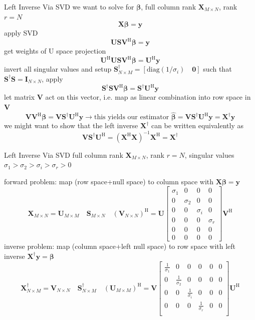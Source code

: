 \documentclass[mathserif, aspectratio=1610]{intbeamer}
\begin{document}
\begin{frame}{Left Inverse Via SVD}
we want to solve for ${\bm{\beta}}$, full column rank $\bm{X}_{M \times N}$, rank $r=N$
$$\bm{X} {\bm{\beta}} = \bm{y}$$
apply SVD
$$\bm{U} \bm{S} \bm{V}^\mathrm{H} {\bm{\beta}} = \bm{y}$$
get weights of U space projection
$$\bm{U}^\mathrm{H} \bm{U} \bm{S} \bm{V}^\mathrm{H} {\bm{\beta}} = \bm{U}^\mathrm{H}\bm{y}$$
invert all singular values and setup $\bm{S}^\dagger_{N \times M} = [\mathrm{diag}(1/\sigma_i) \quad \bm{0}]$ such that
$\bm{S}^\dagger\bm{S} = \bm{I}_{N \times N}$, apply
$$\bm{S}^\dagger\bm{S} \bm{V}^\mathrm{H} {\bm{\beta}} = \bm{S}^\dagger\bm{U}^\mathrm{H}\bm{y}$$
let matrix $\bm{V}$ act on this vector, i.e. map as linear combination into row space in $\bm{V}$
$$\bm{V} \bm{V}^\mathrm{H} {\bm{\beta}} = \bm{V} \bm{S}^\dagger\bm{U}^\mathrm{H}\bm{y}
\rightarrow \text{this yields our estimator } \hat{\bm{\beta}} = \bm{V} \bm{S}^\dagger\bm{U}^\mathrm{H}\bm{y} = \bm{X}^\dagger \bm{y}$$
we might want to show that the left inverse $\bm{X}^\dagger$ can be written equivalently as
$$\bm{V} \bm{S}^\dagger\bm{U}^\mathrm{H} = (\bm{X}^\mathrm{H}\bm{X})^{-1} \bm{X}^\mathrm{H} = \bm{X}^\dagger$$
\end{frame}



\begin{frame}{Left Inverse Via SVD}
full column rank $\bm{X}_{M \times N}$, rank $r=N$, singular values $\sigma_1 > \sigma_2 > \sigma_i > \sigma_r > 0$

forward problem: map (row space+null space) to column space with $\bm{X} \bm{\beta} = \bm{y}$
$$
\bm{X}_{M \times N}
=
\bm{U}_{M \times M}\quad
\bm{S}_{M \times N}\quad
(\bm{V}_{N \times N})^\mathrm{H}=
\bm{U}
\begin{bmatrix}
\sigma_1  & 0  & 0 & 0\\
0 & \sigma_2 & 0 & 0\\
0 & 0 & \sigma_i & 0\\
0 & 0 & 0 & \sigma_r\\
0 & 0 & 0 & 0\\
0 & 0 & 0 & 0
\end{bmatrix}
\bm{V}^\mathrm{H}
$$
inverse problem: map (column space+left null space) to row space with left inverse $\bm{X}^\dagger \bm{y} = \bm{\beta}$
$$
\bm{X}^\dagger_{N \times M}
=
\bm{V}_{N \times N}\quad
\bm{S}^\dagger_{N \times M}\quad
(\bm{U}_{M \times M})^\mathrm{H}
=
\bm{V}
\begin{bmatrix}
\frac{1}{\sigma_1} & 0 & 0 & 0 & 0 & 0\\
0 & \frac{1}{\sigma_2} & 0 & 0 & 0 & 0\\
0 & 0 & \frac{1}{\sigma_i} & 0 & 0 & 0\\
0 & 0 & 0 & \frac{1}{\sigma_r} & 0 & 0\\
\end{bmatrix}
\bm{U}^\mathrm{H}
$$






\end{frame}
\end{document}
